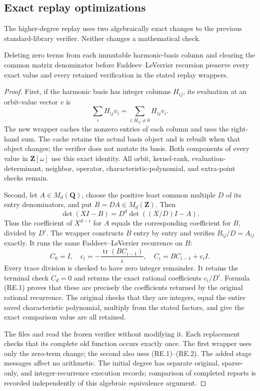 \subsection{Exact replay optimizations}
\label{sec:higher4-replay-equivalence}

The higher-degree replay uses two algebraically exact changes to the
previous standard-library verifier. Neither changes a mathematical check.

\begin{proposition}
Deleting zero terms from each immutable harmonic-basis column and
clearing the common matrix denominator before Faddeev--LeVerrier
recursion preserve every exact value and every retained verification
in the stated replay wrappers.
\end{proposition}

\begin{proof}
First, if the harmonic basis has integer columns \(H_{ij}\), its evaluation
at an orbit-value vector \(v\) is
\[
 \sum_i H_{ij}v_i
   =\sum_{i:H_{ij}\ne0}H_{ij}v_i.
\]
The new wrapper caches the nonzero entries of each column and uses the
right-hand sum. The cache retains the actual basis object and is rebuilt
when that object changes; the verifier does not mutate its basis.
Both components of every value in \(\mathbf Z[\omega]\) use this exact
identity. All orbit, kernel-rank, evaluation-determinant, neighbor,
operator, characteristic-polynomial, and extra-point checks remain.

Second, let \(A\in M_d(\mathbf Q)\), choose the positive least common
multiple \(D\) of its entry denominators, and put \(B=DA\in M_d(\mathbf Z)\).
Then
\[
 \det(XI-B)=D^d\det((X/D)I-A).
 \tag{RE.1}
\]
Thus the coefficient of \(X^{d-i}\) for \(A\) equals the corresponding
coefficient for \(B\), divided by \(D^i\). The wrapper constructs \(B\)
entry by entry and verifies \(B_{ij}/D=A_{ij}\) exactly. It runs the
same Faddeev--LeVerrier recurrence on \(B\):
\[
 C_0=I,
 \quad c_i=-\frac{\operatorname{tr}(BC_{i-1})}{i},
 \quad C_i=BC_{i-1}+c_iI.
 \tag{RE.2}
\]
Every trace division is checked to have zero integer remainder.
It retains the terminal check \(C_d=0\) and returns the exact rational
coefficients \(c_i/D^i\). Formula (RE.1) proves that these are precisely
the coefficients returned by the original rational recurrence. The
original checks that they are integers, equal the entire saved
characteristic polynomial, multiply from the stated factors, and give
the exact comparison value are all retained.

The files
and 
read the frozen verifier without modifying it. Each replacement checks
that its complete old function occurs exactly once. The first wrapper
uses only the zero-term change; the second also uses (RE.1)--(RE.2).
The added stage messages affect no arithmetic. The initial degree has
separate original, sparse-only, and integer-recurrence execution records;
comparison of completed reports is recorded independently of this
algebraic equivalence argument.
\end{proof}
